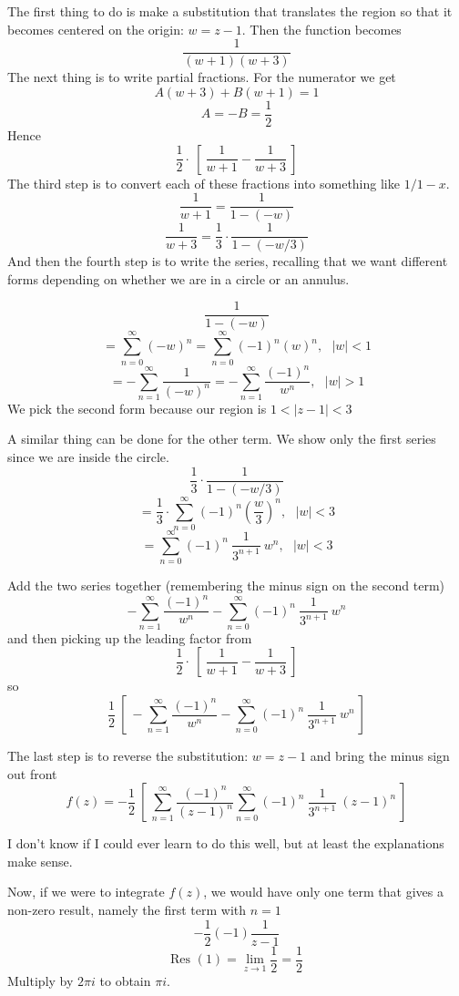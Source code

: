 \documentclass[11pt, oneside]{article}
\begin{document}
The first thing to do is make a substitution that translates the region so that it becomes centered on the origin:  $w = z - 1$.  Then the function becomes
\[  \frac{1}{(w + 1)(w + 3)} \]
The next thing is to write partial fractions.  For the numerator we get
\[ A(w+3) + B(w+1) = 1 \]
\[ A = - B = \frac{1}{2} \]
Hence
\[ \frac{1}{2} \cdot \ [ \ \frac{1}{w+1} - \frac{1}{w+3} \ ] \]
The third step is to convert each of these fractions into something like $1/1-x$.
\[ \frac{1}{w+1} = \frac{1}{1 - (-w)} \]
\[ \frac{1}{w+3}  = \frac{1}{3} \cdot \frac{1}{1 - (-w/3)} \]
And then the fourth step is to write the series, recalling that we want different forms depending on whether we are in a circle or an annulus.

\[ \frac{1}{1 - (-w)} \]
\[ = \sum_{n=0}^{\infty} (-w)^n = \sum_{n=0}^{\infty} (-1)^n (w)^n , \ \ \ |w| < 1 \]
\[ = -\sum_{n=1}^{\infty} \frac{1}{(-w)^n} =  -\sum_{n=1}^{\infty} \frac{(-1)^n}{w^n}, \ \ \ |w| > 1 \]
We pick the second form because our region is $1 < |z-1| < 3$

A similar thing can be done for the other term.  We show only the first series since we are inside the circle.
\[  \frac{1}{3} \cdot \frac{1}{1 - (-w/3)} \]
\[ = \frac{1}{3} \cdot  \sum_{n=0}^{\infty} (-1)^n (\frac{w}{3})^n , \ \ \ |w| < 3 \]
\[ = \sum_{n=0}^{\infty} (-1)^n \ \frac{1}{3^{n+1}} \ w^n , \ \ \ |w| < 3 \]

Add the two series together (remembering the minus sign on the second term)
\[ -\sum_{n=1}^{\infty} \frac{(-1)^n}{w^n} - \sum_{n=0}^{\infty} (-1)^n \ \frac{1}{3^{n+1}} \ w^n \]
and then picking up the leading factor from 
\[ \frac{1}{2} \cdot \ [ \ \frac{1}{w+1} - \frac{1}{w+3} \ ] \]
so
\[ \frac{1}{2} \ [ \ -\sum_{n=1}^{\infty} \frac{(-1)^n}{w^n} - \sum_{n=0}^{\infty} (-1)^n \ \frac{1}{3^{n+1}} \ w^n \ ] \]

The last step is to reverse the substitution:  $w = z - 1$ and bring the minus sign out front
\[ f(z) = - \frac{1}{2} \ [ \ \sum_{n=1}^{\infty} \frac{(-1)^n}{(z-1)^n} \sum_{n=0}^{\infty} (-1)^n \ \frac{1}{3^{n+1}} \ (z-1)^n \ ] \]

I don't know if I could ever learn to do this well, but at least the explanations make sense.

Now, if we were to integrate $f(z)$, we would have only one term that gives a non-zero result, namely the first term with $n=1$
\[ - \frac{1}{2} (-1) \frac{1}{z-1} \]
\[ \text{Res }(1) = \lim_{z \rightarrow 1} \frac{1}{2} = \frac{1}{2} \]
Multiply by $2 \pi i$ to obtain $\pi i$.
\end{document}
